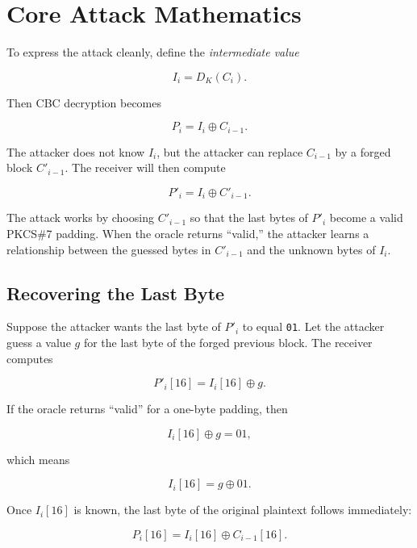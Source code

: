 \section{Core Attack Mathematics}

To express the attack cleanly, define the \emph{intermediate value}

\begin{equation}
    I_i = D_K(C_i).
\end{equation}

Then CBC decryption becomes

\begin{equation}
    P_i = I_i \oplus C_{i-1}.
\end{equation}

The attacker does not know $I_i$, but the attacker can replace $C_{i-1}$ by a forged block $C'_{i-1}$. The receiver will then compute

\begin{equation}
    P'_i = I_i \oplus C'_{i-1}.
\end{equation}

The attack works by choosing $C'_{i-1}$ so that the last bytes of $P'_i$ become a valid PKCS\#7 padding. When the oracle returns ``valid,'' the attacker learns a relationship between the guessed bytes in $C'_{i-1}$ and the unknown bytes of $I_i$.

\subsection{Recovering the Last Byte}

Suppose the attacker wants the last byte of $P'_i$ to equal \texttt{01}. Let the attacker guess a value $g$ for the last byte of the forged previous block. The receiver computes

\[
P'_i[16] = I_i[16] \oplus g.
\]

If the oracle returns ``valid'' for a one-byte padding, then

\[
I_i[16] \oplus g = 01,
\]

which means

\begin{equation}
    I_i[16] = g \oplus 01.
\end{equation}

Once $I_i[16]$ is known, the last byte of the original plaintext follows immediately:

\begin{equation}
    P_i[16] = I_i[16] \oplus C_{i-1}[16].
\end{equation}

